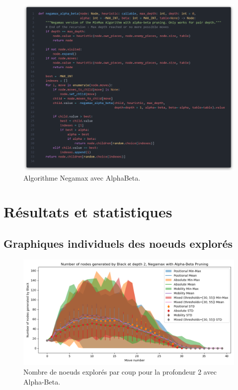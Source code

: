 \begin{figure}[H]
    \centering
    \includegraphics[width=1\textwidth]{ressources/nega-a-b.png}
    \caption{Algorithme Negamax avec AlphaBeta.}
    \label{fig:negamax-a-b}
\end{figure}


\chapter{Résultats et statistiques}
\section{Graphiques individuels des noeuds explorés}
\label{app:node_explored}

\begin{figure}[H]
    \centering
    \includegraphics[width=1\textwidth]{ressources/Number of nodes generated by Black_depth_2_Negamax with Alpha-Beta Pruning.png}
    \caption{Nombre de noeuds explorés par coup pour la profondeur 2 avec Alpha-Beta.}
    \label{fig:node_explored_alpha_beta}
\end{figure}


